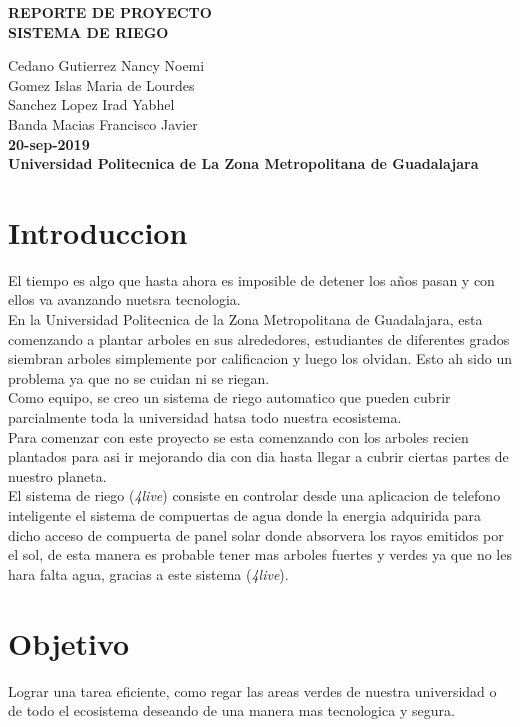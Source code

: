 \documentclass[11pt,a4paper]{article}
\begin{document}
\begin{center}
\textbf{REPORTE DE PROYECTO}\\
\textbf{SISTEMA DE RIEGO}
\end{center}

\begin{center}
Cedano Gutierrez Nancy Noemi\\
Gomez Islas Maria de Lourdes\\
Sanchez Lopez Irad Yabhel\\
Banda Macias Francisco Javier\\
\textbf{20-sep-2019}\\
\textbf{Universidad Politecnica de La Zona Metropolitana de Guadalajara}
\end{center}

\section{Introduccion}
El tiempo es algo que hasta ahora es imposible de detener los años pasan y con ellos va avanzando nuetsra tecnologia.\\
En la Universidad Politecnica de la Zona Metropolitana de Guadalajara, esta comenzando a plantar arboles en sus alrededores, estudiantes de diferentes grados siembran arboles simplemente por calificacion y luego los olvidan. Esto ah sido un problema ya que no se cuidan ni se riegan.\\
Como equipo, se creo un sistema de riego automatico que pueden cubrir parcialmente toda la universidad hatsa todo nuestra ecosistema.\\
Para comenzar con este proyecto se esta comenzando con los arboles recien plantados para asi ir mejorando dia con dia hasta llegar a cubrir ciertas partes de nuestro planeta.\\
El sistema de riego (\emph{4live}) consiste en controlar desde una aplicacion de telefono inteligente el sistema de compuertas de agua donde la energia adquirida para dicho acceso de compuerta de panel solar donde absorvera los rayos emitidos por el sol, de esta manera es probable tener mas arboles fuertes y verdes ya que no les hara falta agua, gracias a este sistema (\emph{4live}).

\section{Objetivo}
Lograr una tarea eficiente, como regar las areas verdes de nuestra universidad o de todo el ecosistema deseando de una manera mas tecnologica y segura.
\end{document}
